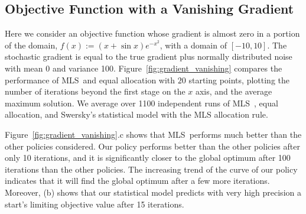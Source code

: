 \documentclass[12pt,english]{article}
\newcommand{\stedit}[1]{{\color{blue} #1}}
\newcommand{\abbrv}{MLS}
\begin{document}
\subsection{Objective Function with a Vanishing Gradient}
\label{gradient_vanishing}

Here we consider an objective function whose gradient is almost zero in a portion of the domain, $f(x):=(x+\sin{x})e^{-x^{2}}$, with a domain of $[-10,10]$. The stochastic gradient is equal to the true gradient plus normally distributed noise with mean 0 and variance 100.
Figure~\ref{fig:gradient_vanishing} compares the performance of \abbrv\ and equal allocation with $20$ starting points, plotting the number of iterations beyond the first stage on the $x$ axis, and the average maximum solution. We average over 1100 independent runs of \abbrv\ , equal allocation, and Swersky's statistical model with the MLS allocation rule. 

\stedit{Figure~\ref{fig:gradient_vanishing}.c shows that \abbrv\ performs much better than the other policies considered. Our policy performs better than the other policies after only 10 iterations, and it is significantly closer to the global optimum after 100 iterations than the other policies. The increasing trend of the curve of our policy indicates that it will find the global optimum after a few more iterations. Moreover, (b) shows that our statistical model predicts with very high precision a start's limiting objective value after 15 iterations. }


\end{document}
